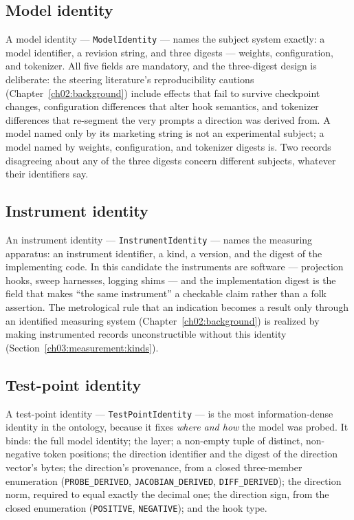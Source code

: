 \subsection{Model identity}\label{ch03:id:model}

A model identity --- \texttt{ModelIdentity} --- names the subject system exactly: a model identifier, a revision string, and three digests --- weights, configuration, and tokenizer. All five fields are mandatory, and the three-digest design is deliberate: the steering literature's reproducibility cautions (Chapter~\ref{ch02:background}) include effects that fail to survive checkpoint changes, configuration differences that alter hook semantics, and tokenizer differences that re-segment the very prompts a direction was derived from. A model named only by its marketing string is not an experimental subject; a model named by weights, configuration, and tokenizer digests is. Two records disagreeing about any of the three digests concern different subjects, whatever their identifiers say.

\subsection{Instrument identity}\label{ch03:id:instrument}

An instrument identity --- \texttt{InstrumentIdentity} --- names the measuring apparatus: an instrument identifier, a kind, a version, and the digest of the implementing code. In this candidate the instruments are software --- projection hooks, sweep harnesses, logging shims --- and the implementation digest is the field that makes ``the same instrument'' a checkable claim rather than a folk assertion. The metrological rule that an indication becomes a result only through an identified measuring system (Chapter~\ref{ch02:background}) is realized by making instrumented records unconstructible without this identity (Section~\ref{ch03:measurement:kinds}).

\subsection{Test-point identity}\label{ch03:id:testpoint}

A test-point identity --- \texttt{TestPointIdentity} --- is the most information-dense identity in the ontology, because it fixes \emph{where and how} the model was probed. It binds: the full model identity; the layer; a non-empty tuple of distinct, non-negative token positions; the direction identifier and the digest of the direction vector's bytes; the direction's provenance, from a closed three-member enumeration (\texttt{PROBE\_DERIVED}, \texttt{JACOBIAN\_DERIVED}, \texttt{DIFF\_DERIVED}); the direction norm, required to equal exactly the decimal one; the direction sign, from the closed enumeration (\texttt{POSITIVE}, \texttt{NEGATIVE}); and the hook type.

